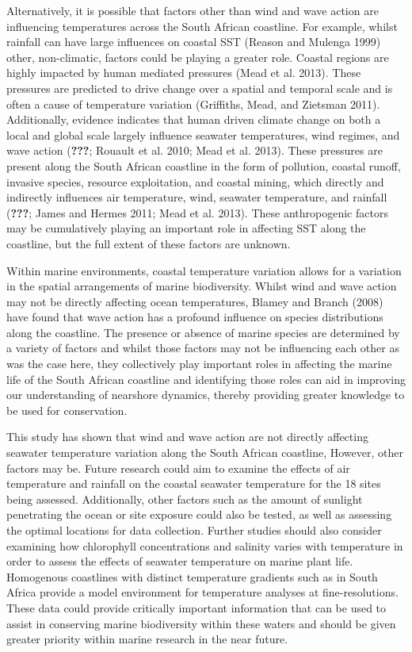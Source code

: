 \documentclass[12pt,a4paper,]{article}
\begin{document}
Alternatively, it is possible that factors other than wind and wave
action are influencing temperatures across the South African coastline.
For example, whilst rainfall can have large influences on coastal SST
(Reason and Mulenga 1999) other, non-climatic, factors could be playing
a greater role. Coastal regions are highly impacted by human mediated
pressures (Mead et al. 2013). These pressures are predicted to drive
change over a spatial and temporal scale and is often a cause of
temperature variation (Griffiths, Mead, and Zietsman 2011).
Additionally, evidence indicates that human driven climate change on
both a local and global scale largely influence seawater temperatures,
wind regimes, and wave action ({\textbf{???}}; Rouault et al. 2010; Mead
et al. 2013). These pressures are present along the South African
coastline in the form of pollution, coastal runoff, invasive species,
resource exploitation, and coastal mining, which directly and indirectly
influences air temperature, wind, seawater temperature, and rainfall
({\textbf{???}}; James and Hermes 2011; Mead et al. 2013). These
anthropogenic factors may be cumulatively playing an important role in
affecting SST along the coastline, but the full extent of these factors
are unknown.

Within marine environments, coastal temperature variation allows for a
variation in the spatial arrangements of marine biodiversity. Whilst
wind and wave action may not be directly affecting ocean temperatures,
Blamey and Branch (2008) have found that wave action has a profound
influence on species distributions along the coastline. The presence or
absence of marine species are determined by a variety of factors and
whilst those factors may not be influencing each other as was the case
here, they collectively play important roles in affecting the marine
life of the South African coastline and identifying those roles can aid
in improving our understanding of nearshore dynamics, thereby providing
greater knowledge to be used for conservation.

This study has shown that wind and wave action are not directly
affecting seawater temperature variation along the South African
coastline, However, other factors may be. Future research could aim to
examine the effects of air temperature and rainfall on the coastal
seawater temperature for the 18 sites being assessed. Additionally,
other factors such as the amount of sunlight penetrating the ocean or
site exposure could also be tested, as well as assessing the optimal
locations for data collection. Further studies should also consider
examining how chlorophyll concentrations and salinity varies with
temperature in order to assess the effects of seawater temperature on
marine plant life. Homogenous coastlines with distinct temperature
gradients such as in South Africa provide a model environment for
temperature analyses at fine-resolutions. These data could provide
critically important information that can be used to assist in
conserving marine biodiversity within these waters and should be given
greater priority within marine research in the near future.
\end{document}
